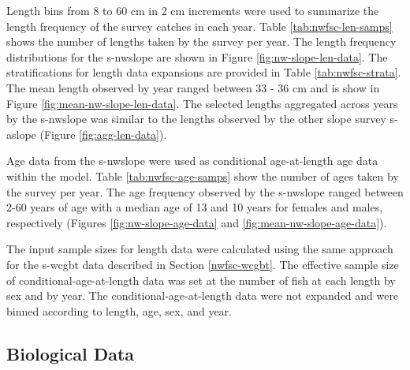 \documentclass[11pt,
  english,
  a4paper,
]{article}
\begin{document}
Length bins from 8 to 60 cm in 2 cm increments were used to summarize the length frequency of the survey catches in each year. Table \ref{tab:nwfsc-len-samps} shows the number of lengths taken by the survey per year. The length frequency distributions for the \gls{s-nwslope} are shown in Figure \ref{fig:nw-slope-len-data}. The stratifications for length data expansions are provided in Table \ref{tab:nwfsc-strata}. The mean length observed by year ranged between 33 - 36 cm and is show in Figure \ref{fig:mean-nw-slope-len-data}. The selected lengths aggregated across years by the \gls{s-nwslope} was similar to the lengths observed by the other slope survey \gls{s-aslope} (Figure \ref{fig:agg-len-data}).

\leavevmode\tagmcend\tagstructend\par


Age data from the \gls{s-nwslope} were used as conditional age-at-length age data within the model. Table \ref{tab:nwfsc-age-samps} show the number of ages taken by the survey per year. The age frequency observed by the \gls{s-nwslope} ranged between 2-60 years of age with a median age of 13 and 10 years for females and males, respectively (Figures \ref{fig:nw-slope-age-data} and \ref{fig:mean-nw-slope-age-data}).

\leavevmode\tagmcend\tagstructend\par


The input sample sizes for length data were calculated using the same approach for the \gls{s-wcgbt} data described in Section \ref{nwfsc-wcgbt}. The effective sample size of conditional-age-at-length data was set at the number of fish at each length by sex and by year. The conditional-age-at-length data were not expanded and were binned according to length, age, sex, and year.

\leavevmode\tagmcend\tagstructend\par


\hypertarget{biological-data}{%
\subsection{Biological Data}\label{biological-data}}

\leavevmode\tagmcend\tagstructend

\end{document}
